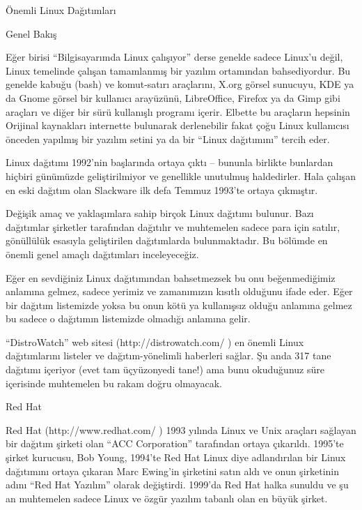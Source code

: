 \begin{section}{Önemli Linux Dağıtımları}
\begin{subsection}{Genel Bakış}

Eğer birisi “Bilgisayarımda Linux çalışıyor” derse genelde sadece Linux'u değil, Linux temelinde çalışan tamamlanmış bir yazılım ortamından bahsediyordur. Bu genelde kabuğu (bash) ve komut-satırı araçlarını, X.org görsel sunucuyu, KDE ya da Gnome görsel bir kullanıcı arayüzünü, LibreOffice, Firefox ya da Gimp gibi araçları ve diğer bir sürü kullanışlı programı içerir. Elbette bu araçların hepsinin Orijinal kaynakları internette bulunarak derlenebilir fakat çoğu Linux kullanıcısı önceden yapılmış bir yazılım setini ya da bir “Linux dağıtımını” tercih eder.

Linux dağıtımı 1992'nin başlarında ortaya çıktı -- bununla birlikte bunlardan hiçbiri günümüzde geliştirilmiyor ve genellikle unutulmuş haldedirler. Hala çalışan en eski dağıtım olan Slackware ilk defa Temmuz 1993'te ortaya çıkmıştır.

Değişik amaç ve yaklaşımlara sahip birçok Linux dağıtımı bulunur. Bazı dağıtımlar şirketler tarafından dağıtılır ve muhtemelen sadece para için satılır, gönüllülük esasıyla geliştirilen dağıtımlarda bulunmaktadır. Bu bölümde en önemli genel amaçlı dağıtımları inceleyeceğiz.

Eğer en sevdiğiniz Linux dağıtımından bahsetmezsek bu onu beğenmediğimiz anlamına gelmez, sadece yerimiz ve zamanımızın kısıtlı olduğunu ifade eder. Eğer bir dağıtım listemizde yoksa bu onun kötü ya kullanışsız olduğu anlamına gelmez bu sadece o dağıtımın listemizde olmadığı anlamına gelir.

“DistroWatch” web sitesi (http://distrowatch.com/ ) en önemli Linux dağıtımlarını listeler ve dağıtım-yönelimli haberleri sağlar. Şu anda 317 tane dağıtımı içeriyor (evet tam üçyüzonyedi tane!) ama bunu okuduğunuz süre içerisinde muhtemelen bu rakam doğru olmayacak.
\end{subsection}
\begin{subsection}{Red Hat}

Red Hat (http://www.redhat.com/ ) 1993 yılında Linux ve Unix araçları sağlayan bir dağıtım şirketi olan “ACC Corporation” tarafından ortaya çıkarıldı. 1995'te şirket kurucusu, Bob Young, 1994'te Red Hat Linux diye adlandırılan bir Linux dağıtımını ortaya çıkaran Marc Ewing'in şirketini satın aldı ve onun şirketinin adını “Red Hat Yazılım” olarak değiştirdi. 1999'da Red Hat halka sunuldu ve şu an muhtemelen sadece Linux ve özgür yazılım tabanlı olan en büyük şirket.


\end{subsection}
\end{section}

